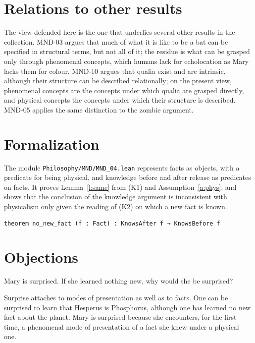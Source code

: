 \documentclass{situationist-preprint}
\begin{document}
\section{Relations to other results}

The view defended here is the one that underlies several other results in the collection. MND-03 argues that much of what it is like to be a bat can be specified in structural terms, but not all of it; the residue is what can be grasped only through phenomenal concepts, which humans lack for echolocation as Mary lacks them for colour. MND-10 argues that qualia exist and are intrinsic, although their structure can be described relationally; on the present view, phenomenal concepts are the concepts under which qualia are grasped directly, and physical concepts the concepts under which their structure is described. MND-05 applies the same distinction to the zombie argument.

\section{Formalization}

The module \nolinkurl{Philosophy/MND/MND_04.lean} represents facts as objects, with a predicate for being physical, and knowledge before and after release as predicates on facts. It proves Lemma~\ref{l:same} from (K1) and Assumption~\ref{a:phys}, and shows that the conclusion of the knowledge argument is inconsistent with physicalism only given the reading of (K2) on which a new fact is known.

\begin{lstlisting}
theorem no_new_fact (f : Fact) : KnowsAfter f → KnowsBefore f
\end{lstlisting}

\section{Objections}

\begin{objection}
Mary is surprised. If she learned nothing new, why would she be surprised?
\end{objection}

\begin{reply}
Surprise attaches to modes of presentation as well as to facts. One can be surprised to learn that Hesperus is Phosphorus, although one has learned no new fact about the planet. Mary is surprised because she encounters, for the first time, a phenomenal mode of presentation of a fact she knew under a physical one.
\end{reply}
\end{document}
